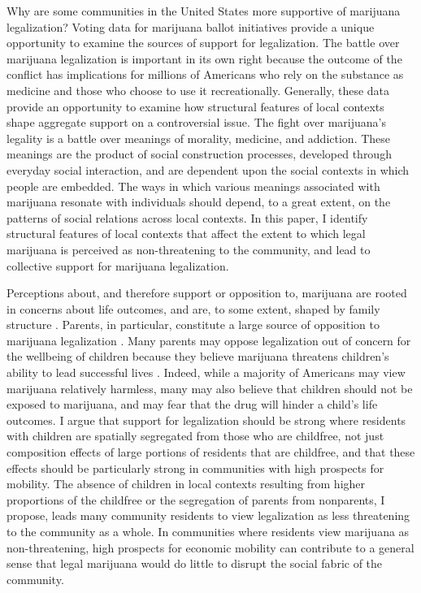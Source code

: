 Why are some communities in the United States more supportive of marijuana legalization? Voting data for marijuana ballot initiatives provide a unique opportunity to examine the sources of support for legalization. The battle over marijuana legalization is important in its own right because the outcome of the conflict has implications for millions of Americans who rely on the substance as medicine and those who choose to use it recreationally. Generally, these data provide an opportunity to examine how structural features of local contexts shape aggregate support on a controversial issue. The fight over marijuana's legality is a battle over meanings of morality, medicine, and addiction. These meanings are the product of social construction processes, developed through everyday social interaction, and are dependent upon the social contexts in which people are embedded. The ways in which various meanings associated with marijuana resonate with individuals should depend, to a great extent, on the patterns of social relations across local contexts. In this paper, I identify structural features of local contexts that affect the extent to which legal marijuana is perceived as non-threatening to the community, and lead to collective support for marijuana legalization. 




Perceptions about, and therefore support or opposition to, marijuana are rooted in concerns about life outcomes, and are, to some extent, shaped by family structure \citep{mosher_and_akins_2019,caulkins_et_al_2012}. Parents, in particular, constitute a large source of opposition to marijuana legalization \citep{elder_and_greene_2019,newhart_and_dolphin_2018,caulkins_et_al_2012,rosenthal_and_kubby_1996}. Many parents may oppose legalization out of concern for the wellbeing of children because they believe marijuana threatens children's ability to lead successful lives \citep{elder_and_greene_2019,newhart_and_dolphin_2018,mosher_and_akins_2019,lynskey_and_hall_2000,kandel_et_al_1986,lifrak_et_al_1997,fergusson_et_al_2002,kandel_2002}. Indeed, while a majority of Americans may view marijuana relatively harmless, many may also believe that children should not be exposed to marijuana, and may fear that the drug will hinder a child's life outcomes\citep{ingraham_2017}. I argue that support for legalization should be strong where residents with children are spatially segregated from those who are childfree, not just composition effects of large portions of residents that are childfree, and that these effects should be particularly strong in communities with high prospects for mobility. The absence of children in local contexts resulting from higher proportions of the childfree or the segregation of parents from nonparents, I propose, leads many community residents to view legalization as less threatening to the community as a whole. In communities where residents view marijuana as non-threatening, high prospects for economic mobility can contribute to a general sense that legal marijuana would do little to disrupt the social fabric of the community. 



